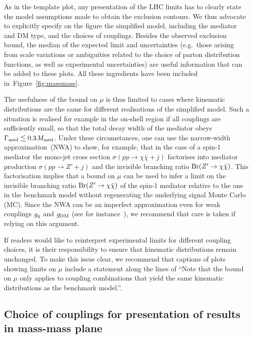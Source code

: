As in the template plot, any presentation of  the LHC limits has to clearly state the model assumptions made to obtain the exclusion contours. We thus advocate to explicitly specify on the figure the simplified model, including the mediator and DM type, and the choices of couplings. 
Besides the observed exclusion bound, the median of the expected limit and uncertainties (e.g.~those arising from scale variations or ambiguities related to the choice of parton distribution functions, as well as experimental uncertainties) are useful information that can be added to these plots. All these ingredients have been included in~Figure~\ref{fig:massmass}. 




The usefulness of the bound on $\mu$ is thus limited to cases where kinematic distributions are  the same for different realisations of the simplified model. Such a situation is realised for example in the on-shell region if all couplings are sufficiently small, so that the total decay  width of the mediator obeys $\Gamma_{\rm med} \lesssim 0.3 \hspace{0.25mm} M_{\rm{med}}$. Under these circumstances, one can use the narrow-width approximation~(NWA) to  show, for example, that in the case of a spin-1 mediator the mono-jet  cross section $\sigma ( p p \to \chi \bar \chi + j)$ factorises into mediator production $\sigma ( p p \to Z' + j)$ and the  invisible branching ratio ${\rm Br} (Z^\prime \rightarrow \chi\bar{\chi})$.  This factorisation implies that a bound on $\mu$ can be used to infer a limit  on the invisible branching ratio ${\rm Br} (Z^\prime \rightarrow \chi\bar{\chi})$ of the spin-1 mediator relative to the one in the benchmark model without regenerating  the underlying signal Monte Carlo (MC). Since the NWA can be an imperfect approximation even for weak couplings $g_q$ and $g_{\rm{DM}}$ (see for instance~\cite{Jacques:2015zha}), we recommend that care is taken if relying on this argument.


If readers would like to reinterpret experimental limits for different coupling choices, it is their responsibility to ensure that kinematic distributions remain unchanged. To make this issue clear, we recommend that captions of plots showing limits on $\mu$  include a statement along the lines of ``Note that the bound on $\mu$ only applies to coupling combinations that yield the same kinematic distributions as the benchmark model.''.

\subsection{Choice of couplings for presentation of results in mass-mass plane}

